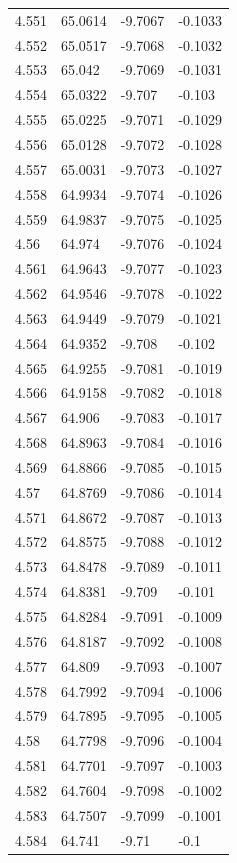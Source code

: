 \begin{tabular}{llll}
4.551 & 65.0614 & -9.7067 & -0.1033 \\
4.552 & 65.0517 & -9.7068 & -0.1032 \\
4.553 & 65.042 & -9.7069 & -0.1031 \\
4.554 & 65.0322 & -9.707 & -0.103 \\
4.555 & 65.0225 & -9.7071 & -0.1029 \\
4.556 & 65.0128 & -9.7072 & -0.1028 \\
4.557 & 65.0031 & -9.7073 & -0.1027 \\
4.558 & 64.9934 & -9.7074 & -0.1026 \\
4.559 & 64.9837 & -9.7075 & -0.1025 \\
4.56 & 64.974 & -9.7076 & -0.1024 \\
4.561 & 64.9643 & -9.7077 & -0.1023 \\
4.562 & 64.9546 & -9.7078 & -0.1022 \\
4.563 & 64.9449 & -9.7079 & -0.1021 \\
4.564 & 64.9352 & -9.708 & -0.102 \\
4.565 & 64.9255 & -9.7081 & -0.1019 \\
4.566 & 64.9158 & -9.7082 & -0.1018 \\
4.567 & 64.906 & -9.7083 & -0.1017 \\
4.568 & 64.8963 & -9.7084 & -0.1016 \\
4.569 & 64.8866 & -9.7085 & -0.1015 \\
4.57 & 64.8769 & -9.7086 & -0.1014 \\
4.571 & 64.8672 & -9.7087 & -0.1013 \\
4.572 & 64.8575 & -9.7088 & -0.1012 \\
4.573 & 64.8478 & -9.7089 & -0.1011 \\
4.574 & 64.8381 & -9.709 & -0.101 \\
4.575 & 64.8284 & -9.7091 & -0.1009 \\
4.576 & 64.8187 & -9.7092 & -0.1008 \\
4.577 & 64.809 & -9.7093 & -0.1007 \\
4.578 & 64.7992 & -9.7094 & -0.1006 \\
4.579 & 64.7895 & -9.7095 & -0.1005 \\
4.58 & 64.7798 & -9.7096 & -0.1004 \\
4.581 & 64.7701 & -9.7097 & -0.1003 \\
4.582 & 64.7604 & -9.7098 & -0.1002 \\
4.583 & 64.7507 & -9.7099 & -0.1001 \\
4.584 & 64.741 & -9.71 & -0.1 \\

\end{tabular}
